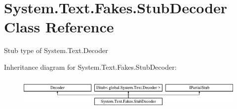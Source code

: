 \hypertarget{class_system_1_1_text_1_1_fakes_1_1_stub_decoder}{\section{System.\-Text.\-Fakes.\-Stub\-Decoder Class Reference}
\label{class_system_1_1_text_1_1_fakes_1_1_stub_decoder}
}


Stub type of System.\-Text.\-Decoder 


Inheritance diagram for System.\-Text.\-Fakes.\-Stub\-Decoder\-:\begin{figure}[H]
\begin{center}
\leavevmode
\includegraphics[height=1.623188cm]{class_system_1_1_text_1_1_fakes_1_1_stub_decoder}
\end{center}
\end{figure}
